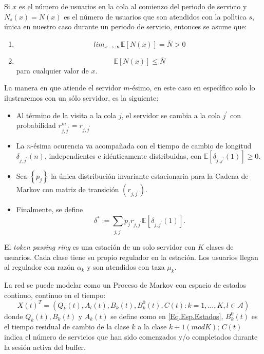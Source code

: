 \documentclass{article}
\newcommand{\esp}{\mathbb{E}}
\begin{document}
Si $x$ es el n{\'u}mero de usuarios en la cola al comienzo del
periodo de servicio y $N_{s}\left(x\right)=N\left(x\right)$ es el
n{\'u}mero de usuarios que son atendidos con la pol{\'\i}tica $s$,
{\'u}nica en nuestro caso durante un periodo de servicio, entonces
se asume que:
\begin{enumerate}
\item
\begin{equation}\label{S1}
lim_{x\rightarrow\infty}\esp\left[N\left(x\right)\right]=\overline{N}>0
\end{equation}
\item
\begin{equation}\label{S2}
\esp\left[N\left(x\right)\right]\leq \overline{N} \end{equation}
para cualquier valor de $x$.
\end{enumerate}
La manera en que atiende el servidor $m$-{\'e}simo, en este caso
en espec{\'\i}fico solo lo ilustraremos con un s{\'o}lo servidor,
es la siguiente:
\begin{itemize}
\item Al t{\'e}rmino de la visita a la cola $j$, el servidor se
cambia a la cola $j^{'}$ con probabilidad
$r_{j,j^{'}}^{m}=r_{j,j^{'}}$

\item La $n$-{\'e}sima ocurencia va acompa{\~n}ada con el tiempo
de cambio de longitud $\delta_{j,j^{'}}\left(n\right)$,
independientes e id{\'e}nticamente distribuidas, con
$\esp\left[\delta_{j,j^{'}}\left(1\right)\right]\geq0$.

\item Sea $\left\{p_{j}\right\}$ la {\'u}nica distribuci{\'o}n
invariante estacionaria para la Cadena de Markov con matriz de
transici{\'o}n $\left(r_{j,j^{'}}\right)$.

\item Finalmente, se define
\begin{equation}
\delta^{*}:=\sum_{j,j^{'}}p_{j}r_{j,j^{'}}\esp\left[\delta_{j,j^{'}}\left(1\right)\right].
\end{equation}
\end{itemize}

El {\em token passing ring} es una estaci\'on de un solo servidor
con $K$ clases de usuarios. Cada clase tiene su propio regulador
en la estaci\'on. Los usuarios llegan al regulador con raz\'on
$\alpha_{k}$ y son atendidos con taza $\mu_{k}$.

La red se puede modelar como un Proceso de Markov con espacio de
estados continuo, continuo en el tiempo:
\begin{equation}
 X\left(t\right)^{T}=\left(Q_{k}\left(t\right),A_{l}\left(t\right),B_{k}\left(t\right),B_{k}^{0}\left(t\right),C\left(t\right):k=1,\ldots,K,l\in\mathcal{A}\right)
\end{equation}
donde $Q_{k}\left(t\right), B_{k}\left(t\right)$ y
$A_{k}\left(t\right)$ se define como en \ref{Eq.Esp.Estados},
$B_{k}^{0}\left(t\right)$ es el tiempo residual de cambio de la
clase $k$ a la clase $k+1\left(mod K\right)$; $C\left(t\right)$
indica el n\'umero de servicios que han sido comenzados y/o
completados durante la sesi\'on activa del buffer.
\end{document}
